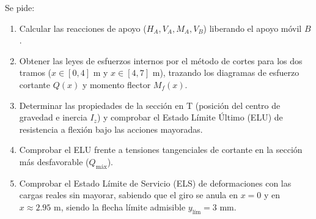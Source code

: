 {\begin{center}
{%
        }
    \end{center}

    Se pide:
    \begin{enumerate}[label=\alph*)]
        \item Calcular las reacciones de apoyo ($H_A, V_A, M_A, V_B$) liberando el apoyo móvil $B$.
        \item Obtener las leyes de esfuerzos internos por el método de cortes para los dos tramos ($x \in [0, 4]\text{ m}$ y $x \in [4, 7]\text{ m}$), trazando los diagramas de esfuerzo cortante $Q(x)$ y momento flector $M_f(x)$.
        \item Determinar las propiedades de la sección en T (posición del centro de gravedad e inercia $I_z$) y comprobar el Estado Límite Último (ELU) de resistencia a flexión bajo las acciones mayoradas.
        \item Comprobar el ELU frente a tensiones tangenciales de cortante en la sección más desfavorable ($Q_{\text{máx}}$).
        \item Comprobar el Estado Límite de Servicio (ELS) de deformaciones con las cargas reales sin mayorar, sabiendo que el giro se anula en $x = 0$ y en $x \approx 2.95\text{ m}$, siendo la flecha límite admisible $y_{\text{lím}} = 3\text{ mm}$.
    \end{enumerate}

}
